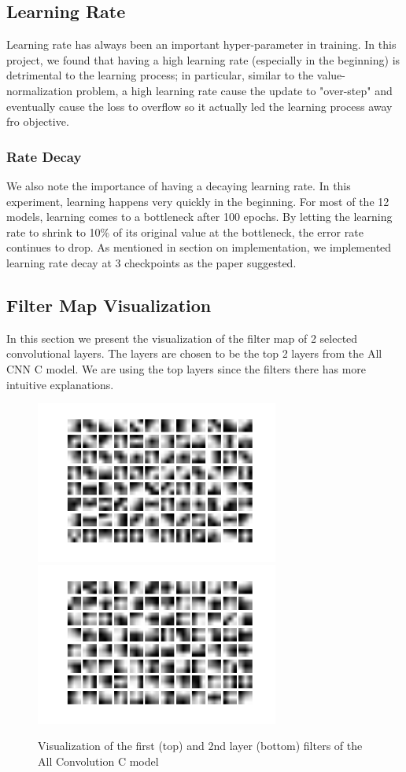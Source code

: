 \subsection{Learning Rate}
    Learning rate has always been an important hyper-parameter in training. In this project, we found that having a high learning rate (especially in the beginning) is detrimental to the learning process; in particular, similar to the value-normalization problem, a high learning rate cause the update to "over-step" and eventually cause the loss to overflow so it actually led the learning process away fro objective.
    \subsubsection{Rate Decay}
        We also note the importance of having a decaying learning rate. In this experiment, learning happens very quickly in the beginning. For most of the 12 models, learning comes to a bottleneck after 100 epochs. By letting the learning rate to shrink to 10\% of its original value at the bottleneck, the error rate continues to drop. As mentioned in section on implementation, we implemented learning rate decay at 3 checkpoints as the paper suggested.
        
        
\subsection{Filter Map Visualization} 
    In this section we present the visualization of the filter map of 2 selected convolutional layers. The layers are chosen to be the top 2 layers from the All CNN C model. We are using the top layers since the filters there has more intuitive explanations.
     \begin{figure}[hb]
    	\includegraphics[width = 8cm]{img/conv1_1.png}
    	\includegraphics[width=8cm]{img/conv1_2.png}
    	\caption{Visualization of the first (top) and 2nd layer (bottom) filters of the All Convolution C model}
    	\label{fig:frog}
    \end{figure}
    
